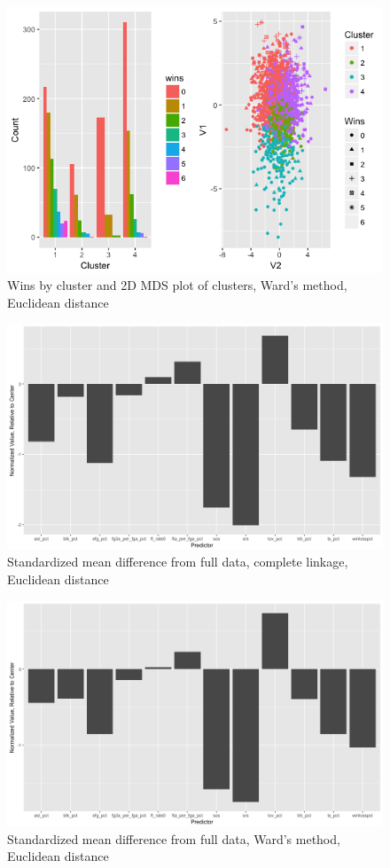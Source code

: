 \documentclass[10pt,a4paper, hidelinks]{article} %
\begin{document}
\begin{figure}[H]
	\centering
	\includegraphics[width=0.7\linewidth]{../fig/ward1}
		\caption{Wins by cluster and 2D MDS plot of clusters, Ward's method, Euclidean distance}
\end{figure}

\begin{figure}[H]
	\centering
	\includegraphics[width=0.7\linewidth]{../fig/compweak}
		\caption{Standardized mean difference from full data, complete linkage, Euclidean distance}
\end{figure}

\begin{figure}[H]
	\centering
	\includegraphics[width=0.7\linewidth]{"../fig/wardweak"}
		\caption{Standardized mean difference from full data, Ward's method, Euclidean distance}
\end{figure}
\end{document}
